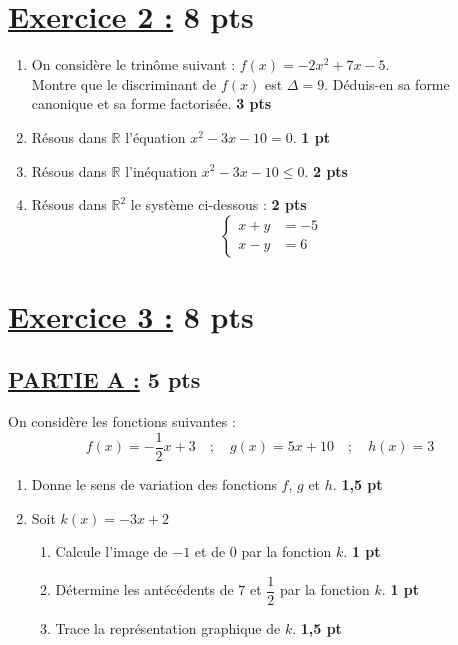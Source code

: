 \documentclass[12pt,a4paper]{article}
\begin{document}
\vspace{0.5cm}

\section*{\underline{Exercice 2 :} 8 pts }
\begin{enumerate}
    \item On considère le trinôme suivant : \( f(x) = -2x^2 + 7x - 5 \).\\
    Montre que le discriminant de \( f(x) \) est \( \Delta = 9 \). Déduis-en sa forme canonique et sa forme factorisée. \hfill \textbf{3 pts}
    
    \item Résous dans \( \mathbb{R} \) l’équation \( x^2 - 3x - 10 = 0 \). \hfill \textbf{1 pt}
    
    \item Résous dans \( \mathbb{R} \) l’inéquation \( x^2 - 3x - 10 \leq 0 \). \hfill \textbf{2 pts}
    
    \item Résous dans \( \mathbb{R}^2 \) le système ci-dessous : \hfill \textbf{2 pts}
    \[
    \left\{
    \begin{aligned}
        x + y &= -5 \\
        x - y &= 6
    \end{aligned}
    \right.
    \]
\end{enumerate}

\section*{\underline{ Exercice 3 :} 8 pts}

\subsection*{\underline{PARTIE A :} 5 pts}

On considère les fonctions suivantes :
\[
f(x) = -\frac{1}{2}x + 3 \quad ; \quad g(x) = 5x + 10 \quad ; \quad h(x) = 3
\]
\begin{enumerate}
    \item Donne le sens de variation des fonctions \( f \), \( g \) et \( h \). \hfill \textbf{1,5 pt}
    
    \item Soit \( k(x) = -3x + 2 \)
    \begin{enumerate}
        \item Calcule l’image de \(-1\) et de \(0\) par la fonction \(k\). \hfill \textbf{1 pt}
        \item Détermine les antécédents de \(7\) et \(\dfrac{1}{2}\) par la fonction \(k\). \hfill \textbf{1 pt}
        \item Trace la représentation graphique de \(k\). \hfill \textbf{1,5 pt}
    \end{enumerate}
\end{enumerate}
\end{document}
